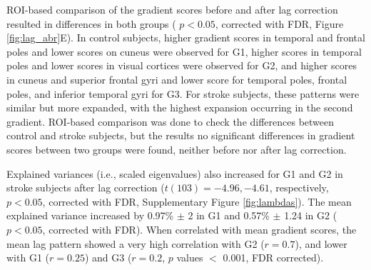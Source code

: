 \documentclass[fleqn,10pt]{wlscirep}
\begin{document}
ROI-based comparison of the gradient scores before and after lag correction resulted in differences in both groups ( $p < 0.05$, corrected with FDR, Figure \ref{fig:lag_abr}E). In control subjects, higher gradient scores in temporal and frontal poles and lower scores on cuneus were observed for G1, higher scores in temporal poles and lower scores in visual cortices were observed for G2, and higher scores in cuneus and superior frontal gyri and lower score for temporal poles, frontal poles, and inferior temporal gyri for G3. For stroke subjects, these patterns were similar but more expanded, with the highest expansion occurring in the second gradient. ROI-based comparison was done to check the differences between control and stroke subjects, but the results no significant differences in gradient scores between two groups were found, neither before nor after lag correction.

Explained variances (i.e., scaled eigenvalues) also increased for G1 and G2 in stroke subjects after lag correction ($t(103) = -4.96, -4.61$, respectively, $p < 0.05$, corrected with FDR, Supplementary Figure \ref{fig:lambdas}). The mean explained variance increased by 0.97\% $\pm$ 2 in G1 and 0.57\% $\pm$ 1.24 in G2 ($p < 0.05$, corrected with FDR). When correlated with mean gradient scores, the mean lag pattern showed a very high correlation with G2 ($r = 0.7$), and lower with G1 ($r = 0.25$) and G3 ($r = 0.2$, $p$ values $<$ 0.001, FDR corrected).
\end{document}
